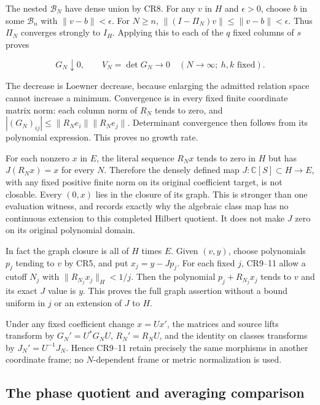 The nested \(\mathcal B_N\) have dense union by CR8. For any \(v\) in \(H\) and \(\epsilon>0\), choose \(b\) in some \(\mathcal B_n\) with \(\|v-b\|<\epsilon\). For \(N\ge n\), \(\|(I-\Pi_N)v\|\le\|v-b\|<\epsilon\). Thus \(\Pi_N\) converges strongly to \(I_H\). Applying this to each of the \(q\) fixed columns of \(s\) proves

\[
\boxed{G_N\downarrow0,\qquad V_N=\det G_N\longrightarrow0
\quad(N\longrightarrow\infty;\ h,k\text{ fixed}).}
\tag{CR11}
\]

The decrease is Loewner decrease, because enlarging the admitted relation space cannot increase a minimum. Convergence is in every fixed finite coordinate matrix norm: each column norm of \(R_N\) tends to zero, and \(|(G_N)_{ij}|\le\|R_Ne_i\|\|R_Ne_j\|\). Determinant convergence then follows from its polynomial expression. This proves no growth rate.

For each nonzero \(x\) in \(E\), the literal sequence \(R_Nx\) tends to zero in \(H\) but has \(J(R_Nx)=x\) for every \(N\). Therefore the densely defined map \(J:\mathbb C[S]\subset H\to E\), with any fixed positive finite norm on its original coefficient target, is not closable. Every \((0,x)\) lies in the closure of its graph. This is stronger than one evaluation witness, and records exactly why the algebraic class map has no continuous extension to this completed Hilbert quotient. It does not make \(J\) zero on its original polynomial domain.

In fact the graph closure is all of \(H\) times \(E\). Given \((v,y)\), choose polynomials \(p_j\) tending to \(v\) by CR5, and put \(x_j=y-Jp_j\). For each fixed \(j\), CR9--11 allow a cutoff \(N_j\) with \(\|R_{N_j}x_j\|_H<1/j\). Then the polynomial \(p_j+R_{N_j}x_j\) tends to \(v\) and its exact \(J\) value is \(y\). This proves the full graph assertion without a bound uniform in \(j\) or an extension of \(J\) to \(H\).

Under any fixed coefficient change \(x=Ux'\), the matrices and source lifts transform by \(G_N'=U^*G_NU\), \(R_N'=R_NU\), and the identity on classes transforms by \(J_N'=U^{-1}J_N\). Hence CR9--11 retain precisely the same morphisms in another coordinate frame; no \(N\)-dependent frame or metric normalization is used.

\subsection{The phase quotient and averaging comparison}\label{the-phase-quotient-and-averaging-comparison}

